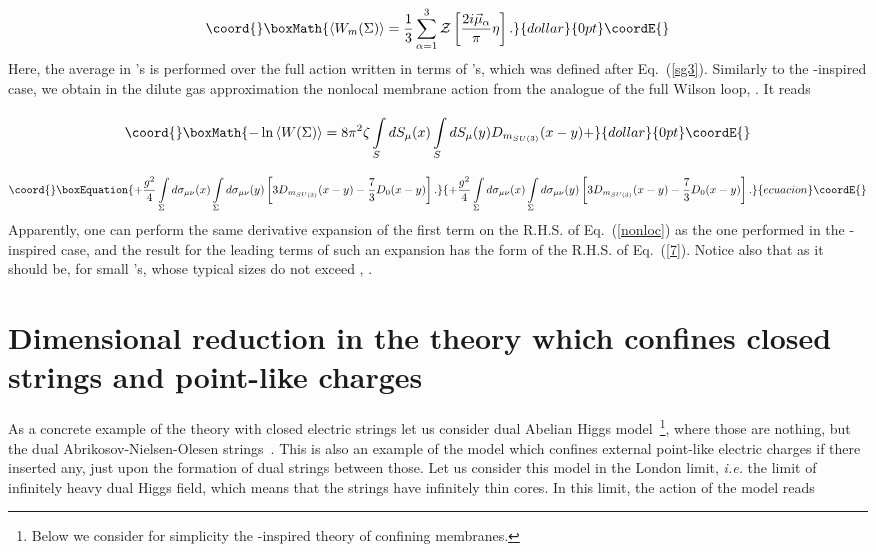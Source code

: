 \documentclass[a4paper,12pt]{article}
\begin{document}
$$\coord{}\boxMath{\left<W_m(\Sigma)\right>=\frac13\sum\limits_{\alpha=1}^{3}{\cal Z}\left[\frac{2i\vec\mu_\alpha}{\pi}\eta\right].}{dollar}{0pt}\coordE{}$$
Here, the average in \coordHE{}'s is performed over the full action written in terms of \myHighlight{$\vec\rho{\,}$}\coordHE{}'s, which was defined after Eq.~(\ref{sg3}).
Similarly to the \coordHE{}-inspired case, we obtain in the dilute gas approximation the nonlocal membrane action from the 
analogue of the full Wilson loop, \coordHE{}. It reads

$$\coord{}\boxMath{-\ln\left<W(\Sigma)\right>=8\pi^2\zeta\int\limits_{S}^{}dS_\mu(x)\int\limits_{S}^{}dS_\mu(y)D_{m_{SU(3)}}(x-y)+}{dollar}{0pt}\coordE{}$$

\begin{equation}\coord{}\boxEquation{
\label{nonloc}
+\frac{g^2}{4}\int\limits_{\Sigma}^{}d\sigma_{\mu\nu}(x)\int\limits_{\Sigma}^{}d\sigma_{\mu\nu}(y)
\left[3D_{m_{SU(3)}}(x-y)-\frac73D_0(x-y)\right].
}{
+\frac{g^2}{4}\int\limits_{\Sigma}^{}d\sigma_{\mu\nu}(x)\int\limits_{\Sigma}^{}d\sigma_{\mu\nu}(y)
\left[3D_{m_{SU(3)}}(x-y)-\frac73D_0(x-y)\right].
}{ecuacion}\coordE{}\end{equation}
Apparently, one can perform the same derivative expansion of the first term on the R.H.S. of Eq.~(\ref{nonloc}) as the one 
performed in the \coordHE{}-inspired case, and the result for the leading terms of such an expansion 
has the form of the R.H.S. of Eq.~(\ref{7}).
Notice also that as it should be, for small \myHighlight{$\Sigma$}\coordHE{}'s, whose typical sizes do not exceed \coordHE{}, 
\coordHE{}.








\section{Dimensional reduction in the theory which confines closed strings and point-like charges}

As a concrete example of the theory with closed electric strings let us consider dual Abelian
Higgs model~\footnote{Below we consider for simplicity the \coordHE{}-inspired theory of confining membranes.}, 
where those are nothing, but the dual Abrikosov-Nielsen-Olesen strings~\cite{ano}.
This is also an example of the model which confines external point-like electric charges if there inserted any, just upon the 
formation of dual strings between those.
Let us consider this model in the London limit, {\it i.e.} the limit  
of infinitely heavy dual Higgs field, which means that the strings have infinitely thin cores.
In this limit, the action of the model reads
\end{document}
